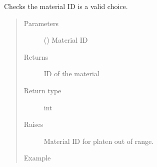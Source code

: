 \documentclass[letterpaper,10pt,english]{sphinxmanual}
\begin{document}
\begin{fulllineitems}
\begin{fulllineitems}
\begin{quote}
\begin{description}
\begin{sphinxVerbatim}[commandchars=\\\{\}]
\PYG{p}{[}  \PYG{p}{]}
\PYG{p}{[}  \PYG{p}{]}
\end{sphinxVerbatim}

\end{description}\end{quote}

\end{fulllineitems}


\begin{fulllineitems}
\label{\detokenize{openfdem:openfdem.openfdem.Model.mat_bound_check}}
Checks the material ID is a valid choice.
\begin{quote}\begin{description}
\item[{Parameters}] \leavevmode
{} () \textendash{} Material ID

\item[{Returns}] \leavevmode
ID of the material

\item[{Return type}] \leavevmode
int

\item[{Raises}] \leavevmode
{} \textendash{} Material ID for platen out of range.

\item[{Example}] \leavevmode
\begin{sphinxVerbatim}[commandchars=\\\{\}]
   
  


\end{sphinxVerbatim}
\end{description}
\end{quote}
\end{fulllineitems}
\end{fulllineitems}
\end{document}
